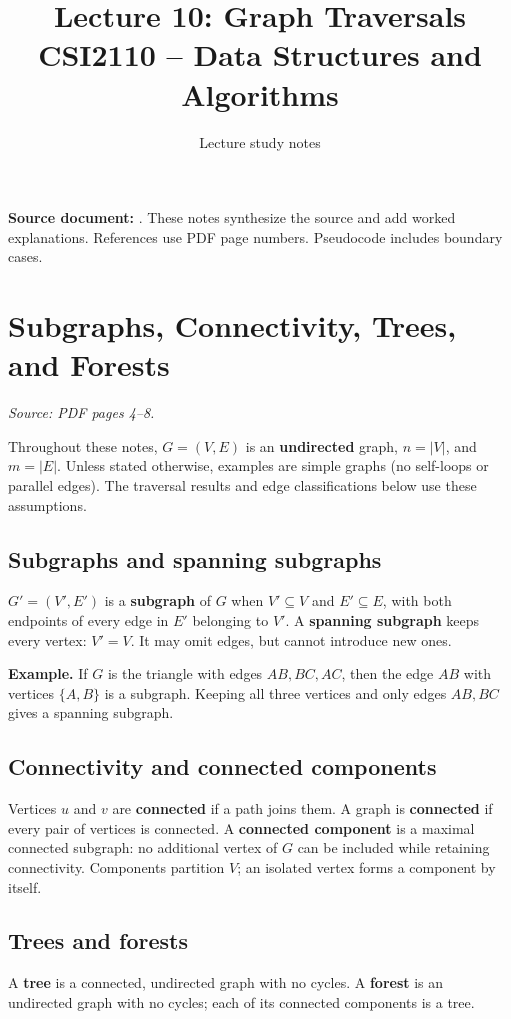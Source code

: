 \documentclass[11pt,letterpaper]{article}
\title{\textbf{Lecture 10: Graph Traversals}\\\large CSI2110 -- Data Structures and Algorithms}\author{Lecture study notes}\date{}
\newcommand{\sourcepages}[1]{\textit{Source: PDF pages #1.}}
\begin{document}
\maketitle
\textbf{Source document:} . These notes synthesize the source and add worked explanations. References use PDF page numbers. Pseudocode includes boundary cases.
{\small\tableofcontents}\newpage
\section{Subgraphs, Connectivity, Trees, and Forests}
\sourcepages{4--8}

Throughout these notes, $G=(V,E)$ is an \textbf{undirected} graph, $n=|V|$, and $m=|E|$. Unless stated otherwise, examples are simple graphs (no self-loops or parallel edges). The traversal results and edge classifications below use these assumptions.

\subsection{Subgraphs and spanning subgraphs}
$G'=(V',E')$ is a \textbf{subgraph} of $G$ when $V'\subseteq V$ and $E'\subseteq E$, with both endpoints of every edge in $E'$ belonging to $V'$. A \textbf{spanning subgraph} keeps every vertex: $V'=V$. It may omit edges, but cannot introduce new ones.

\textbf{Example.} If $G$ is the triangle with edges $AB,BC,AC$, then the edge $AB$ with vertices $\{A,B\}$ is a subgraph. Keeping all three vertices and only edges $AB,BC$ gives a spanning subgraph.

\subsection{Connectivity and connected components}
Vertices $u$ and $v$ are \textbf{connected} if a path joins them. A graph is \textbf{connected} if every pair of vertices is connected. A \textbf{connected component} is a maximal connected subgraph: no additional vertex of $G$ can be included while retaining connectivity. Components partition $V$; an isolated vertex forms a component by itself.

\subsection{Trees and forests}
A \textbf{tree} is a connected, undirected graph with no cycles. A \textbf{forest} is an undirected graph with no cycles; each of its connected components is a tree.
\end{document}

